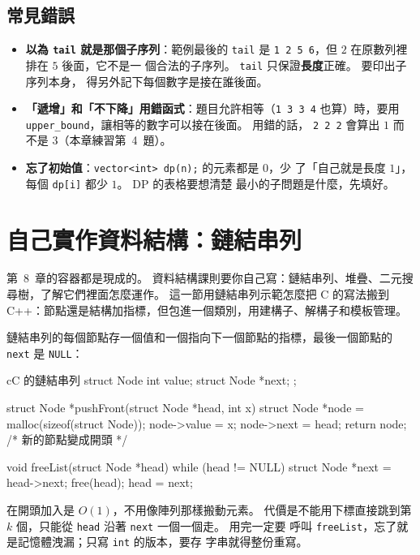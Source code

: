 \subsection{常見錯誤}

\begin{itemize}
\item \textbf{以為 \texttt{tail} 就是那個子序列}：範例最後的
\texttt{tail} 是 \texttt{1 2 5 6}，但 $2$ 在原數列裡排在 $5$ 後面，它不是一
個合法的子序列。 \texttt{tail} 只保證\textbf{長度}正確。 要印出子序列本身，
得另外記下每個數字是接在誰後面。
\item \textbf{「遞增」和「不下降」用錯函式}：題目允許相等（\texttt{1 3 3 4}
也算）時，要用 \texttt{upper\_bound}，讓相等的數字可以接在後面。 用錯的話，
\texttt{2 2 2} 會算出 $1$ 而不是 $3$（本章練習第~4~題）。
\item \textbf{忘了初始值}：\texttt{vector<int> dp(n);} 的元素都是 $0$，少
了「自己就是長度 $1$」，每個 \texttt{dp[i]} 都少 $1$。 DP 的表格要想清楚
最小的子問題是什麼，先填好。
\end{itemize}

\section{自己實作資料結構：鏈結串列}
\label{sec:linked-list}

第~8~章的容器都是現成的。 資料結構課則要你自己寫：鏈結串列、堆疊、二元搜
尋樹，了解它們裡面怎麼運作。 這一節用鏈結串列示範怎麼把 C 的寫法搬到
C++：節點還是結構加指標，但包進一個類別，用建構子、解構子和模板管理。

\begin{crecap}[鏈結串列]
鏈結串列的每個節點存一個值和一個指向下一個節點的指標，最後一個節點的
\texttt{next} 是 \texttt{NULL}：

\begin{code}{c}{C 的鏈結串列}
struct Node {
    int value;
    struct Node *next;
};

struct Node *pushFront(struct Node *head, int x) {
    struct Node *node = malloc(sizeof(struct Node));
    node->value = x;
    node->next = head;
    return node;               /* 新的節點變成開頭 */
}

void freeList(struct Node *head) {
    while (head != NULL) {
        struct Node *next = head->next;
        free(head);
        head = next;
    }
}
\end{code}

在開頭加入是 $O(1)$，不用像陣列那樣搬動元素。 代價是不能用下標直接跳到第
$k$ 個，只能從 \texttt{head} 沿著 \texttt{next} 一個一個走。 用完一定要
呼叫 \texttt{freeList}，忘了就是記憶體洩漏；只寫 \texttt{int} 的版本，要存
字串就得整份重寫。
\end{crecap}

